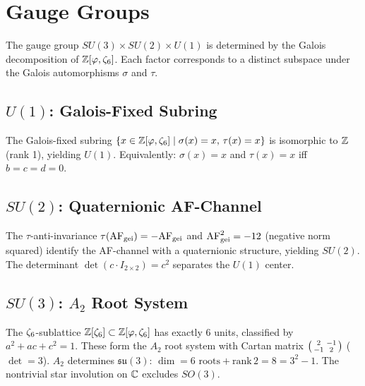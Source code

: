 \chapter{Gauge Groups}
\label{ch:gauge}

The gauge group $SU(3)\times SU(2)\times U(1)$
is determined by the Galois decomposition of $\mathbb{Z}[\varphi,\zeta_6]$.
Each factor corresponds to a distinct subspace
under the Galois automorphisms $\sigma$ and $\tau$.

\section{\texorpdfstring{$U(1)$}{U(1)}: Galois-Fixed Subring}

\begin{theorem}[$U(1)$ uniqueness]
\label{thm:u1-uniqueness}
The Galois-fixed subring $\{x \in \mathbb{Z}[\varphi,\zeta_6] \mid \sigma(x) = x,\, \tau(x) = x\}$
is isomorphic to $\mathbb{Z}$ (rank 1), yielding $U(1)$.
Equivalently: $\sigma(x) = x$ and $\tau(x) = x$ iff $b = c = d = 0$.
\end{theorem}

\section{\texorpdfstring{$SU(2)$}{SU(2)}: Quaternionic AF-Channel}

\begin{theorem}[$SU(2)$ uniqueness]
\label{thm:su2-uniqueness}
The $\tau$-anti-invariance $\tau(\mathrm{AF}_{\mathrm{gei}}) = -\mathrm{AF}_{\mathrm{gei}}$
and $\mathrm{AF}_{\mathrm{gei}}^2 = -12$ (negative norm squared)
identify the AF-channel with a quaternionic structure, yielding $SU(2)$.
The determinant $\det(c \cdot I_{2\times 2}) = c^2$ separates the $U(1)$ center.
\end{theorem}

\section{\texorpdfstring{$SU(3)$}{SU(3)}: \texorpdfstring{$A_2$}{A2} Root System}

\begin{theorem}[$SU(3)$ uniqueness]
\label{thm:su3-uniqueness}
The $\zeta_6$-sublattice $\mathbb{Z}[\zeta_6] \subset \mathbb{Z}[\varphi,\zeta_6]$ has exactly 6 units,
classified by $a^2 + ac + c^2 = 1$.
These form the $A_2$ root system with Cartan matrix
$\begin{psmallmatrix} 2 & -1 \\ -1 & 2 \end{psmallmatrix}$ ($\det = 3$).
$A_2$ determines $\mathfrak{su}(3)$: $\dim = 6\text{ roots} + \mathrm{rank}\,2 = 8 = 3^2 - 1$.
The nontrivial star involution on $\mathbb{C}$ excludes $SO(3)$.
\end{theorem}

